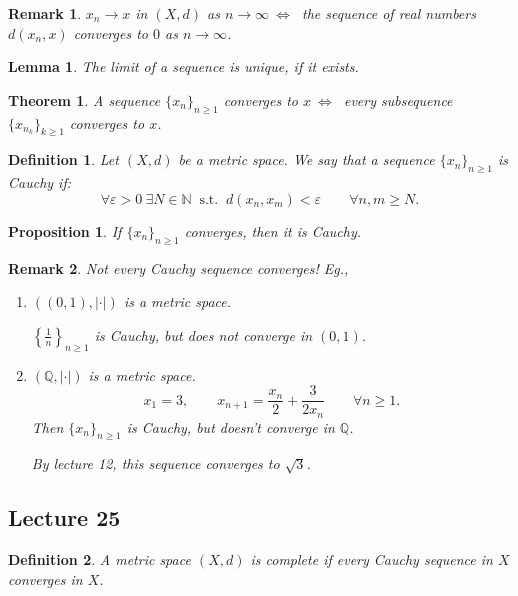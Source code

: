 \documentclass[12pt]{article}
\newtheorem*{lemma}{Lemma}
\newtheorem*{remark}{Remark}
\newtheorem{theorem}{Theorem}
\newtheorem{proposition}{Proposition}
\newtheorem{definition}{Definition}
\begin{document}
\begin{remark}
$x_n\to x$ in $(X,d)$ as $n\to\infty \ \Leftrightarrow\ $ the sequence of real
numbers $d(x_n,x)$ converges to $0$ as $n\to\infty$.
\end{remark}

\begin{lemma}
The limit of a sequence is unique, if it exists.
\end{lemma}

\begin{theorem}
A sequence $\{x_n\}_{n\ge 1}$ converges to $x \ \Leftrightarrow\ $ every
subsequence $\{x_{n_k}\}_{k\ge 1}$ converges to $x$.
\end{theorem}

\begin{definition}
Let $(X,d)$ be a metric space. We say that a sequence $\{x_n\}_{n\ge 1}$ is
Cauchy if:
\[
\forall \varepsilon>0\ \exists N\in\mathbb{N}\ \text{ s.t. }\ d(x_n,x_m)<\varepsilon
\qquad \forall n,m\ge N.
\]
\end{definition}

\begin{proposition}
If $\{x_n\}_{n\ge 1}$ converges, then it is Cauchy.
\end{proposition}

\begin{remark}
Not every Cauchy sequence converges! Eg.,
\begin{enumerate}[label=\textbf{(\arabic*)}]
  \item $((0,1),|\cdot|)$ is a metric space.

  $\left\{\frac{1}{n}\right\}_{n\ge 1}$ is Cauchy, but does not converge in
  $(0,1)$.
  \item $(\mathbb{Q},|\cdot|)$ is a metric space.
  \[
  x_1=3,\qquad x_{n+1}=\frac{x_n}{2}+\frac{3}{2x_n}\qquad \forall n\ge 1.
  \]
  Then $\{x_n\}_{n\ge 1}$ is Cauchy, but doesn't converge in $\mathbb{Q}$.

  By lecture 12, this sequence converges to $\sqrt{3}$.
\end{enumerate}
\end{remark}

\subsection*{Lecture 25}

\begin{definition}
A metric space $(X,d)$ is complete if every Cauchy sequence in $X$ converges in
$X$.
\end{definition}
\end{document}
